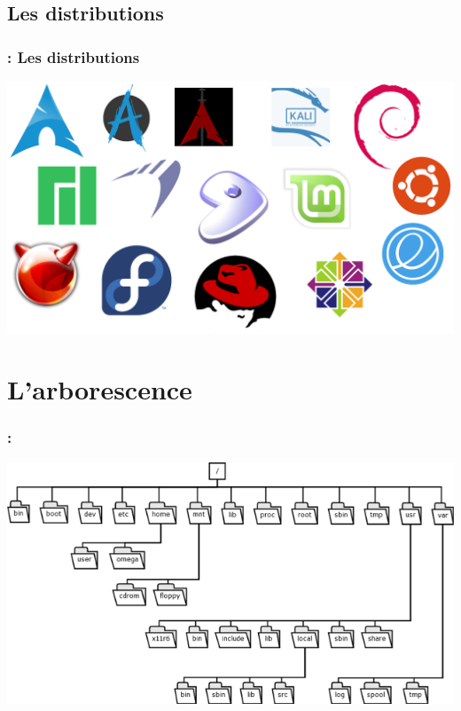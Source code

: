 \documentclass{beamer}
\newenvironment{slide}[1]{
  \begin{frame}[environment=slide]
    \frametitle{\textbf{\insertsection}  : #1}}
{\end{frame}}
\begin{document}
\subsection{Les distributions}

\begin{slide}{Les distributions}
  \begin{center}
    \includegraphics[scale=0.5]{Images/distro_mosaic.png}
  \end{center}
\end{slide}

\section{L'arborescence}

\begin{slide}{}
  \begin{center}
    \includegraphics[scale=0.3]{Images/arborescence.png}
  \end{center}
\end{slide}
\end{document}
